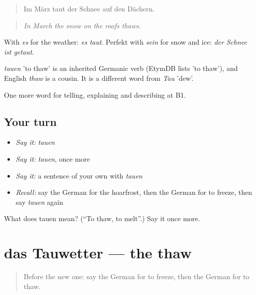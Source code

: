 \begin{quote}
Im März taut der Schnee auf den Dächern.
\end{quote}

\begin{quote}
\emph{In March the snow on the roofs thaws.}
\end{quote}

With \emph{es} for the weather: \emph{es taut}. Perfekt with \emph{sein} for snow and ice: \emph{der Schnee ist getaut}.

\begin{cousinweb}
\emph{tauen} 'to thaw' is an inherited Germanic verb (EtymDB lists 'to thaw'), and English \emph{thaw} is a cousin. It is a different word from \emph{Tau} 'dew'.
\end{cousinweb}

\begin{grammarlens}[title={What you've built}]
One more word for telling, explaining and describing at B1.
\end{grammarlens}

\subsection*{Your turn}
\begin{itemize}
\raggedright
  \item \emph{Say it:} \emph{tauen}
  \item \emph{Say it:} \emph{tauen}, once more
  \item \emph{Say it:} a sentence of your own with \emph{tauen}
  \item \emph{Recall:} say the German for the hoarfrost, then the German for to freeze, then say \emph{tauen} again
\end{itemize}

\begin{tcolorbox}[breakable,colback=teal!4,colframe=teal!35!black,title={Before you move on}]
What does tauen mean? (\textquotedblleft{}To thaw, to melt\textquotedblright{}.) Say it once more.
\end{tcolorbox}
\section[das Tauwetter]{das Tauwetter — the thaw}

\label{lesson:GE-C463-tauwetter}



\begin{quote}
Before the new one: say the German for to freeze, then the German for to thaw.
\end{quote}

